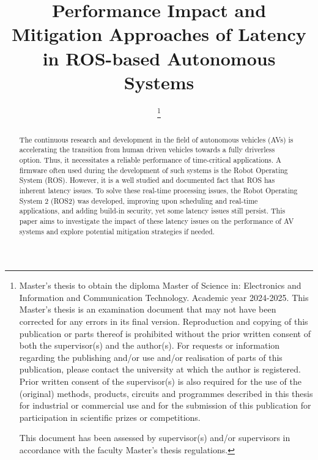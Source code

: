 \documentclass[conference,a4paper]{IEEEtran}
\begin{document}
%
\title{Performance Impact and Mitigation Approaches of Latency in ROS-based Autonomous Systems}

\author{
	\thanks{Master's thesis to obtain the diploma 
			Master of Science in: Electronics and Information and Communication Technology. Academic year \mbox{2024-2025}.
			This Master's thesis is an examination document that may not have been corrected for any errors in its final version. 
			Reproduction and copying of this publication or parts thereof is prohibited without the prior written consent of 
			both the supervisor(s) and the author(s). For requests or information regarding the publishing and/or use and/or 
			realisation of parts of this publication, please contact the university at which the author is registered.
			Prior written consent of the supervisor(s) is also required for the use of the (original) methods, products, 
			circuits and programmes described in this thesis for industrial or commercial use and for the submission of this 
			publication for participation in scientific prizes or competitions.

			This document has been assessed by supervisor(s) and/or supervisors in accordance with the faculty 
			Master's thesis regulations.}
}

\maketitle

\setlength{\parskip}{0em}
\setlength{\parindent}{10pt}
\begin{abstract}
The continuous research and development in the field of autonomous vehicles (AVs) is accelerating the transition from human driven vehicles towards a fully driverless option.
Thus, it necessitates a reliable performance of \mbox{time-critical} applications. 
A firmware often used during the development of such systems is the Robot Operating System (ROS). 
However, it is a well studied and documented fact that ROS has inherent latency issues. 
To solve these \mbox{real-time} processing issues, the Robot Operating System 2 (ROS2) was developed, improving upon scheduling and \mbox{real-time} applications, and adding \mbox{build-in} security, yet some latency issues still persist.
This paper aims to investigate the impact of these latency issues on the performance of AV systems and explore potential mitigation strategies if needed.
\end{abstract}
\end{document}
